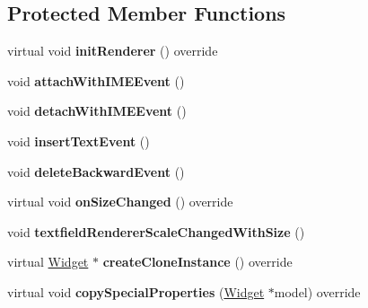 \subsection*{Protected Member Functions}
\begin{DoxyCompactItemize}
\item 
\mbox{\label{classui_1_1TextField_a66df381a06fa95d65fb235fe3b9ee886}} 
virtual void {\bfseries init\+Renderer} () override
\item 
\mbox{\label{classui_1_1TextField_abd1681a6ef446a861177847332f5ae7d}} 
void {\bfseries attach\+With\+I\+M\+E\+Event} ()
\item 
\mbox{\label{classui_1_1TextField_a9d7c3e395f70c099b956a5bbac90e211}} 
void {\bfseries detach\+With\+I\+M\+E\+Event} ()
\item 
\mbox{\label{classui_1_1TextField_a79c3e3b5e8d5e988b411b6b677334e19}} 
void {\bfseries insert\+Text\+Event} ()
\item 
\mbox{\label{classui_1_1TextField_aa398b25931127f0769f8adad3cb10185}} 
void {\bfseries delete\+Backward\+Event} ()
\item 
\mbox{\label{classui_1_1TextField_afb274f5b04afbadd5daf29984d2e0f22}} 
virtual void {\bfseries on\+Size\+Changed} () override
\item 
\mbox{\label{classui_1_1TextField_aa0357d9bb9ee208e2eb328224048ad1a}} 
void {\bfseries textfield\+Renderer\+Scale\+Changed\+With\+Size} ()
\item 
\mbox{\label{classui_1_1TextField_ad551deabdb233038c4153e0914a74bf6}} 
virtual \hyperlink{classui_1_1Widget}{Widget} $\ast$ {\bfseries create\+Clone\+Instance} () override
\item 
\mbox{\label{classui_1_1TextField_ae7b1f39256f29fd9a02e48535fd3bf3b}} 
virtual void {\bfseries copy\+Special\+Properties} (\hyperlink{classui_1_1Widget}{Widget} $\ast$model) override
\item 
\mbox{\label{classui_1_1TextField_a419535cba362ca1d735a2cc635654882}} 

\end{DoxyCompactItemize}

